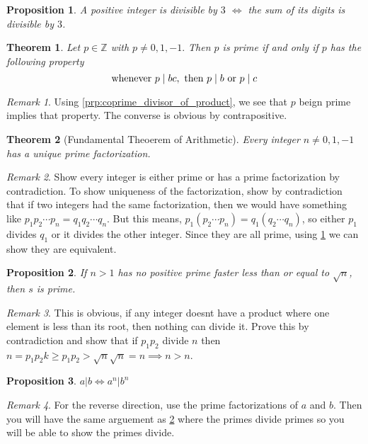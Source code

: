 \documentclass{article}
\newtheorem{theorem}{Theorem}[section]
\newtheorem{proposition}{Proposition}[section]
\theoremstyle{definition}
\theoremstyle{remark}
\newtheorem{remark}{Remark}[section]
\begin{document}
\begin{proposition}
A positive integer is divisible by $3$ $\iff$ the sum of its digits is divisible by $3$.
\end{proposition}

\begin{theorem}\label{thm:prime_dividing_product}
Let \(p \in \mathbb{Z}\) with \(p \neq 0,1, -1.\) Then \(p\) is prime if and only if \(p\) has the following property
\[
\textnormal{whenever } p \mid bc, \textnormal{ then } p \mid b \textnormal{ or } p \mid c
\]
\end{theorem}
\begin{remark}
Using \ref{prp:coprime_divisor_of_product}, we see that $p$ 
beign prime implies that property. The converse is obvious 
by contrapositive. 
\end{remark}


\begin{theorem}[Fundamental Theoerem of Arithmetic]\label{thm:fund_thm_of_arith}
Every integer \(n \neq 0, 1, -1\) has a unique prime factorization.
\end{theorem}
\begin{remark}
Show every integer is either prime or 
has a prime factorization by contradiction. To show uniqueness of the factorization, 
show by contradiction that if two integers had the same 
factorization, then we would have something like $p_1p_2\cdots p_n = q_1q_2\cdots q_n$. 
But this means, $p_1(p_2\cdots p_n) = q_1(q_2 \cdots q_n)$, so either $p_1$ divides $q_1$ or
it divides the other integer. Since they are all prime, using \ref{thm:prime_dividing_product}
we can show they are equivalent.  
\end{remark}






\begin{proposition}
If $n>1$ has no positive prime faster less than or equal to $\sqrt{n}$, then $s$ is prime.
\end{proposition}

\begin{remark}
This is obvious, if any integer doesnt have a product where one element 
is less than its root, then nothing can divide it. Prove this 
by contradiction and show that if $p_1p_2$ divide $n$ then 
$ n = p_1p_2k \geq p_1p_2 > \sqrt{n}\sqrt{n} = n \implies n > n$.
\end{remark}

\begin{proposition}
$a|b \iff a^n | b^n$
\end{proposition}
\begin{remark}
For the reverse direction, use the prime factorizations of $a$ and $b$.
Then you will have the same arguement as \ref{thm:fund_thm_of_arith} 
where the primes divide primes so you will be able to show the primes divide. 
\end{remark}
\end{document}
